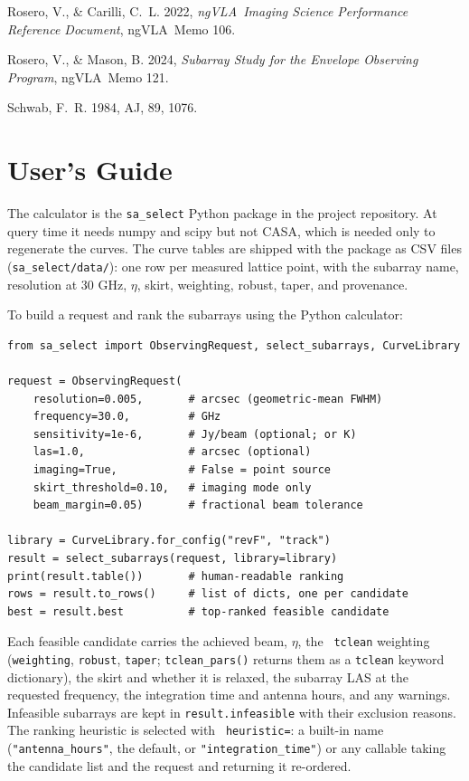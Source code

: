 \documentclass[11pt]{article}
\newcommand{\ngvla}{ngVLA}
\begin{document}
\begin{thebibliography}{}

Rosero, V., \& Carilli, C.~L. 2022, {\it \ngvla\ Imaging Science
Performance Reference Document}, \ngvla\ Memo 106.

Rosero, V., \& Mason, B. 2024, {\it Subarray Study for the Envelope
Observing Program}, \ngvla\ Memo 121.

Schwab, F.~R. 1984, AJ, 89, 1076.

\end{thebibliography}

\appendix

\section{User's Guide}
\label{sec:guide}

The calculator is the {\tt sa\_select} Python package in the project
repository.  At query time it needs numpy and scipy but not CASA, which is needed
only to regenerate the curves.  The curve tables are shipped with the package as CSV files
({\tt sa\_select/data/}): one row per measured lattice point, with
the subarray name, resolution at 30 GHz, $\eta$, skirt, weighting,
robust, taper, and provenance.

To build a request and rank the subarrays using the Python calculator:
\begin{verbatim}
from sa_select import ObservingRequest, select_subarrays, CurveLibrary

request = ObservingRequest(
    resolution=0.005,       # arcsec (geometric-mean FWHM)
    frequency=30.0,         # GHz
    sensitivity=1e-6,       # Jy/beam (optional; or K)
    las=1.0,                # arcsec (optional)
    imaging=True,           # False = point source
    skirt_threshold=0.10,   # imaging mode only
    beam_margin=0.05)       # fractional beam tolerance

library = CurveLibrary.for_config("revF", "track")
result = select_subarrays(request, library=library)
print(result.table())       # human-readable ranking
rows = result.to_rows()     # list of dicts, one per candidate
best = result.best          # top-ranked feasible candidate
\end{verbatim}
Each feasible candidate carries the achieved beam, $\eta$, the {\tt
tclean} weighting ({\tt weighting}, {\tt robust}, {\tt taper};
{\tt tclean\_pars()} returns them as a {\tt tclean} keyword
dictionary), the
skirt and whether it is relaxed, the subarray LAS at the requested
frequency, the integration time and antenna hours, and any warnings.
Infeasible subarrays are kept in {\tt result.infeasible} with their
exclusion reasons.  The ranking heuristic is selected with {\tt
heuristic=}: a built-in name ({\tt "antenna\_hours"}, the default, or
{\tt "integration\_time"}) or any callable taking the candidate list
and the request and returning it re-ordered.
\end{document}
